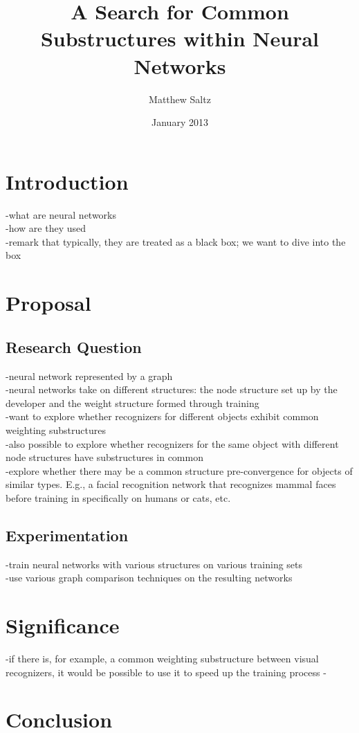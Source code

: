 \documentclass{article}
\begin{document}
\title{A Search for Common Substructures within Neural Networks}
\author{Matthew Saltz}
\date{January 2013}
\maketitle

\section{Introduction}
-what are neural networks\\
-how are they used\\
-remark that typically, they are treated as a black box; we want to dive into the box
\section{Proposal}

\subsection{Research Question}

-neural network represented by a graph\\
-neural networks take on different structures:  the node structure set up by the developer and the weight structure formed through training\\
-want to explore whether recognizers for different objects exhibit common weighting substructures\\
-also possible to explore whether recognizers for the same object with different node structures have substructures in common\\
-explore whether there may be a common structure pre-convergence for objects of similar types. E.g., a facial recognition network that recognizes mammal faces before training in specifically on humans or cats, etc.

\subsection{Experimentation}

-train neural networks with various structures on various training sets\\
-use various graph comparison techniques on the resulting networks\\

\section{Significance}

-if there is, for example, a common weighting substructure between visual recognizers, it would be possible to use it to speed up the training process
-

\section{Conclusion}
\end{document}
